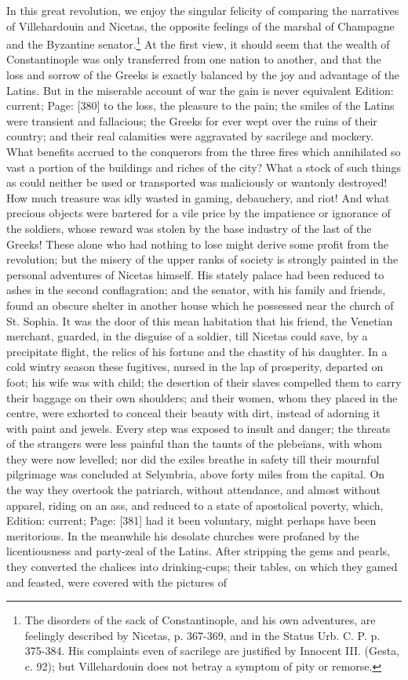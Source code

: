 In this great revolution, we enjoy the singular felicity of comparing the narratives of Villehardouin and Nicetas, the opposite feelings of the marshal of Champagne and the Byzantine senator.\footnote{The disorders of the sack of Constantinople, and his own adventures, are feelingly described by Nicetas, p. 367-369, and in the Status Urb. C. P. p. 375-384. His complaints even of sacrilege are justified by Innocent III. (Gesta, c. 92); but Villehardouin does not betray a symptom of pity or remorse.} At the first view, it should seem that the wealth of Constantinople was only transferred from one nation to another, and that the loss and sorrow of the Greeks is exactly balanced by the joy and advantage of the Latins. But in the miserable account of war the gain is never equivalent Edition: current; Page: [380] to the loss, the pleasure to the pain; the smiles of the Latins were transient and fallacious; the Greeks for ever wept over the ruins of their country; and their real calamities were aggravated by sacrilege and mockery. What benefits accrued to the conquerors from the three fires which annihilated so vast a portion of the buildings and riches of the city? What a stock of such things as could neither be used or transported was maliciously or wantonly destroyed! How much treasure was idly wasted in gaming, debauchery, and riot! And what precious objects were bartered for a vile price by the impatience or ignorance of the soldiers, whose reward was stolen by the base industry of the last of the Greeks! These alone who had nothing to lose might derive some profit from the revolution; but the misery of the upper ranks of society is strongly painted in the personal adventures of Nicetas himself. His stately palace had been reduced to ashes in the second conflagration; and the senator, with his family and friends, found an obscure shelter in another house which he possessed near the church of St. Sophia. It was the door of this mean habitation that his friend, the Venetian merchant, guarded, in the disguise of a soldier, till Nicetas could save, by a precipitate flight, the relics of his fortune and the chastity of his daughter. In a cold wintry season these fugitives, nursed in the lap of prosperity, departed on foot; his wife was with child; the desertion of their slaves compelled them to carry their baggage on their own shoulders; and their women, whom they placed in the centre, were exhorted to conceal their beauty with dirt, instead of adorning it with paint and jewels. Every step was exposed to insult and danger; the threats of the strangers were less painful than the taunts of the plebeïans, with whom they were now levelled; nor did the exiles breathe in safety till their mournful pilgrimage was concluded at Selymbria, above forty miles from the capital. On the way they overtook the patriarch, without attendance, and almost without apparel, riding on an ass, and reduced to a state of apostolical poverty, which, Edition: current; Page: [381] had it been voluntary, might perhaps have been meritorious. In the meanwhile his desolate churches were profaned by the licentiousness and party-zeal of the Latins. After stripping the gems and pearls, they converted the chalices into drinking-cups; their tables, on which they gamed and feasted, were covered with the pictures of 